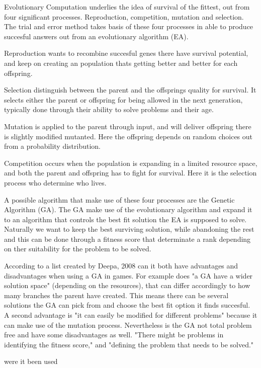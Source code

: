 Evolutionary Computation underlies the idea of survival of the fittest, out from four significant processes.
Reproduction, competition, mutation and selection. \cite{Fogel1997} The trial and error method takes basis of these four processes in able to produce succesful answers out from an evolutionary algorithm (EA).


Reproduction wants to recombine succesful genes there have survival potential, and keep on creating an population thats getting better and better for each offspring. \cite{Fogel1997}

Selection distinguish between the parent and the offsprings quality for survival. It selects either the parent or offspring for being allowed in the next generation, typically done through their ability to solve problems and their age.   \cite{Smith2007}

Mutation is applied to the parent through input, and will deliver offspring there is slightly modified mutanted. Here the offspring depends on random choices out from a probability distribution.  \cite{Smith2007}


Competition occurs when the population is expanding in a limited resource space, and both the parent and offspring has to fight for survival. Here it is the selection process who determine who lives. \cite{Fogel1997}



A possible algorithm that make use of these four processes are the Genetic Algorithm (GA). The GA make use of the evolutionary algorithm and expand it to an algorithm that controls the best fit solution the EA is supposed to solve. Naturally we want to keep the best surviving solution, while abandoning the rest and this can be done through a fitness score that determinate a rank depending on ther suitability for the problem to be solved. \cite {Sivanandam2008}

According to a list created by Deepa, 2008 can it both have advantages and disadvantages when using a GA in games.
For example does "a GA have a wider solution space" (depending on the resources), that can differ accordingly to how many branches the parent have created. This means there can be several solutions the GA can pick from and choose the best fit option it finds succesful.
A second advantage is "it can easily be modified for different problems" because it can make use of the mutation process.
Nevertheless is the GA not total problem free and have some disadvantages as well. "There might be problems in identifying the fitness score," and "defining the problem that needs to be solved."



were it been used





